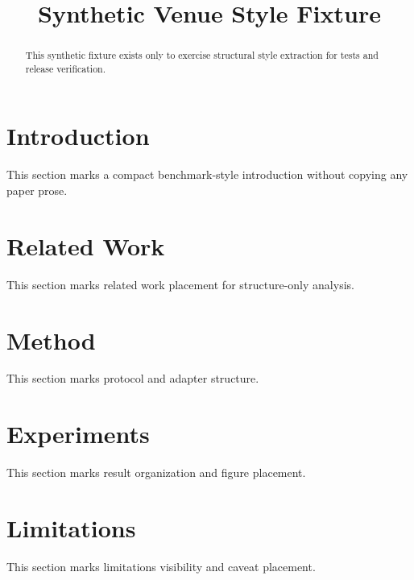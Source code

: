 \documentclass{article}
\title{Synthetic Venue Style Fixture}
\begin{document}
\maketitle
\begin{abstract}
This synthetic fixture exists only to exercise structural style extraction for tests and release verification.
\end{abstract}
\section{Introduction}
This section marks a compact benchmark-style introduction without copying any paper prose.
\section{Related Work}
This section marks related work placement for structure-only analysis.
\section{Method}
This section marks protocol and adapter structure.
\section{Experiments}
This section marks result organization and figure placement.
\section{Limitations}
This section marks limitations visibility and caveat placement.
\end{document}
